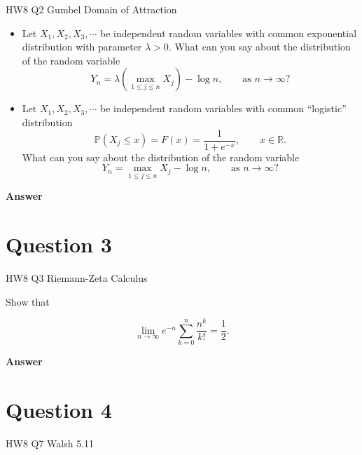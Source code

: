 \documentclass[letterpaper]{article}
\begin{document}
		{\color{deepred} HW8 Q2 Gumbel Domain of Attraction}
		
		\begin{itemize}
			\item[(i)] Let $X_1,X_2,X_3,\cdots$ be independent random variables with common exponential distribution with parameter $\lambda>0$. What can you say about the distribution of the random variable
			\[
			Y_n=\lambda\left(\max_{1\le j\le n} X_j\right)-\log n,
			\qquad \text{as } n\to\infty?
			\]
			
			\item[(ii)] Let $X_1,X_2,X_3,\cdots$ be independent random variables with common ``logistic'' distribution
			\[
			\mathbb{P}(X_j\le x)=F(x)=\frac{1}{1+e^{-x}},\qquad x\in\mathbb{R}.
			\]
			What can you say about the distribution of the random variable
			\[
			Y_n=\max_{1\le j\le n} X_j-\log n,
			\qquad \text{as } n\to\infty?
			\]
		\end{itemize}
		
		\textbf{Answer}
		
			
		
		\clearpage
		
		\section{Question 3}
		
		{\color{deepred} HW8 Q3 Riemann-Zeta Calculus} 
		
		Show that
		
		$$
		\lim _{n \rightarrow \infty} e^{-n} \sum_{k=0}^{n} \frac{n^{k}}{k!}=\frac{1}{2} .
		$$
		
		\textbf{Answer} 
		
		
		
		\clearpage
		
		\section{Question 4}
		
		
		{\color{deepred} HW8 Q7 Walsh 5.11}
		
\end{document}
